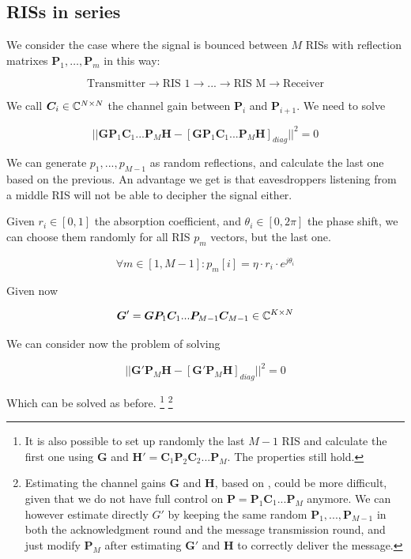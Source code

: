\subsection{RISs in series}

We consider the case where the signal is bounced between $M$ RISs with reflection matrixes $\bm{P}_1, \ldots, \bm{P}_m$ in this way:

\begin{equation}
  \text{Transmitter} \rightarrow \text{RIS 1} \rightarrow ... \rightarrow \text{RIS M} \rightarrow \text{Receiver}
\end{equation}

We call $\bm{C}_i \in \mathbb{C}^{N \times N}$ the channel gain between $\bm{P}_i$ and $\bm{P}_{i+1}$. We need to solve

\begin{equation}
  || \bm{GP}_1\bm{C}_1...\bm{P}_M\bm{H} - [\bm{GP}_1\bm{C}_1...\bm{P}_M\bm{H}]_{diag} || ^2 = 0
\end{equation}

We can generate $p_1, ..., p_{M-1}$ as random reflections, and calculate the last one based on the previous. An advantage we get is that eavesdroppers listening from a middle RIS will not be able to decipher the signal either.

Given $r_i \in [0, 1]$ the absorption coefficient, and $\theta_i \in [0, 2\pi]$ the phase shift, we can choose them randomly for all RIS $p_m$ vectors, but the last one.

\begin{equation}
  \forall m \in [1, M-1] : p_m[i] = \eta \cdot r_i \cdot e^{j\theta_i}
\end{equation}

Given now

\begin{equation}
  \bm{G}' = \bm{GP}_1\bm{C}_1...\bm{P}_{M-1}\bm{C}_{M-1} \in \mathbb{C}^{K \times N}
\end{equation}

We can consider now the problem of solving

\begin{equation}
  || \bm{G}'\bm{P}_M\bm{H} - [\bm{G}'\bm{P}_M\bm{H}]_{diag} || ^2 = 0
\end{equation}

Which can be solved as before.
\footnote{It is also possible to set up randomly the last $M-1$ RIS and calculate the first one using $\bm{G}$ and $\bm{H}'=\bm{C}_1\bm{P}_2\bm{C}_2...\bm{P}_M$. The properties still hold.}
\footnote{Estimating the channel gains $\bm{G}$ and $\bm{H}$, based on \cite{8879620}, could be more difficult, given that we do not have full control on $\bm{P}=\bm{P}_1\bm{C}_1...\bm{P}_M$ anymore. We can however estimate directly $G'$ by keeping the same random $\bm{P}_1, ..., \bm{P}_{M-1}$ in both the acknowledgment round and the message transmission round, and just modify $\bm{P}_M$ after estimating $\bm{G}'$ and $\bm{H}$ to correctly deliver the message.}

